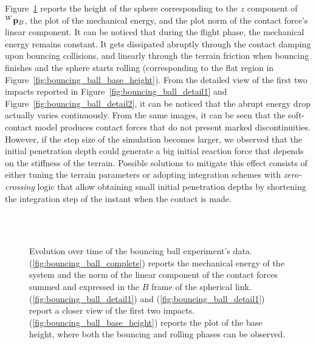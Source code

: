 Figure~\ref{fig:bouncing_ball} reports the height of the sphere corresponding to the $z$ component of $\pos[W]_B$, the plot of the mechanical energy, and the plot norm of the contact force's linear component.
It can be noticed that during the flight phase, the mechanical energy remains constant.
It gets dissipated abruptly through the contact damping upon bouncing collisions, and linearly through the terrain friction when bouncing finishes and the sphere starts rolling (corresponding to the flat region in Figure~\ref{fig:bouncing_ball_base_height}).
From the detailed view of the first two impacts reported in Figure~\ref{fig:bouncing_ball_detail1} and Figure~\ref{fig:bouncing_ball_detail2}, it can be noticed that the abrupt energy drop actually varies continuously.
From the same images, it can be seen that the soft-contact model produces contact forces that do not present marked discontinuities.
However, if the step size of the simulation becomes larger, we observed that the initial penetration depth could generate a big initial reaction force that depends on the stiffness of the terrain.
Possible solutions to mitigate this effect consists of either tuning the terrain parameters or adopting integration schemes with \emph{zero-crossing} logic that allow obtaining small initial penetration depths by shortening the integration step of the instant when the contact is made.

\begin{figure}
    \centering
    \\
    \\
    \caption{Evolution over time of the bouncing ball experiment's data. (\ref{fig:bouncing_ball_complete}) reports the mechanical energy of the system and the norm of the linear component of the contact forces summed and expressed in the $B$ frame of the spherical link. (\ref{fig:bouncing_ball_detail1}) and (\ref{fig:bouncing_ball_detail1}) report a closer view of the first two impacts. (\ref{fig:bouncing_ball_base_height}) reports the plot of the base height, where both the bouncing and rolling phases can be observed.}
    \label{fig:bouncing_ball}
\end{figure}

